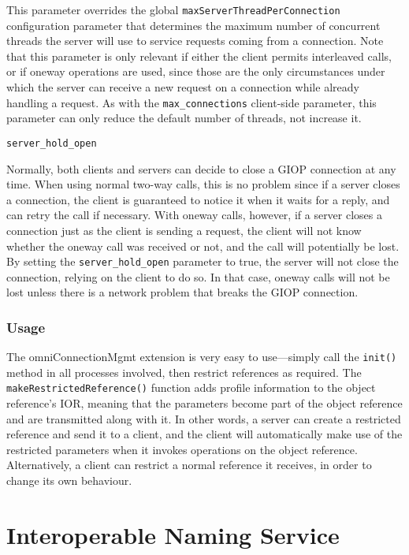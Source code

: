 \documentclass[11pt,oneside,a4paper]{book}
\makeatletter
\newcommand{\code}[1]{\texttt{#1}}
\newcommand{\op}[1]{\texttt{#1()}}
\newcommand{\confoptnd}[1]
  {\vspace{\baselineskip}\par\noindent\code{#1}}
\renewcommand{\confoptnd}[1]
  {\vspace{\baselineskip}\par\noindent\code{#1}\\[-1ex]\@afterheading}
\makeatother
\begin{document}
This parameter overrides the global
\code{maxServerThreadPerConnection} configuration parameter that
determines the maximum number of concurrent threads the server will
use to service requests coming from a connection. Note that this
parameter is only relevant if either the client permits interleaved
calls, or if oneway operations are used, since those are the only
circumstances under which the server can receive a new request on a
connection while already handling a request. As with the
\code{max\_connections} client-side parameter, this parameter can only
reduce the default number of threads, not increase it.

\confoptnd{server\_hold\_open}

Normally, both clients and servers can decide to close a GIOP
connection at any time. When using normal two-way calls, this is no
problem since if a server closes a connection, the client is
guaranteed to notice it when it waits for a reply, and can retry the
call if necessary. With oneway calls, however, if a server closes a
connection just as the client is sending a request, the client will
not know whether the oneway call was received or not, and the call
will potentially be lost. By setting the \code{server\_hold\_open}
parameter to true, the server will not close the connection, relying
on the client to do so. In that case, oneway calls will not be lost
unless there is a network problem that breaks the GIOP connection.


\subsection{Usage}

The omniConnectionMgmt extension is very easy to use---simply call the
\op{init} method in all processes involved, then restrict references
as required. The \op{makeRestrictedReference} function adds profile
information to the object reference's IOR, meaning that the parameters
become part of the object reference and are transmitted along with
it. In other words, a server can create a restricted reference and
send it to a client, and the client will automatically make use of the
restricted parameters when it invokes operations on the object
reference. Alternatively, a client can restrict a normal reference it
receives, in order to change its own behaviour.





\chapter{Interoperable Naming Service}
\label{chap:ins}
\end{document}
